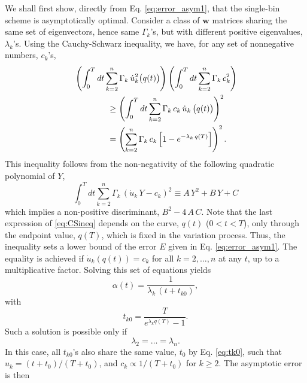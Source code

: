 \documentclass[reprint, floatfix]{revtex4-1}
\newcommand{\Err}{E}
\begin{document}
We shall first show,
directly from Eq. \eqref{eq:error_asym1},
that the single-bin scheme is asymptotically optimal.
%
Consider a class of $\mathbf w$ matrices
sharing the same set of eigenvectors,
hence same $\Gamma_k$'s,
but with different positive eigenvalues,
$\lambda_k$'s.
%
Using the Cauchy-Schwarz inequality, we have,
for any set of nonnegative numbers, $c_k$'s,
%
\begin{align}
&
\left(
  \int_0^T dt
    \sum_{k = 2}^n
      \Gamma_k \, \dot u_k^2\bigl( q(t) \bigr)
\right)
%
\left(
  \int_0^T dt
    \sum_{k = 2}^n
      \Gamma_k \, c_k^2
\right)
%
\notag
\\
&
\qquad \qquad
\ge
\left(
  \int_0^T dt
    \sum_{k = 2}^n
      \Gamma_k \, c_k \, \dot u_k \, \bigl( q(t) \bigr)
\right)^2
\notag
\\
&
\qquad \qquad
=
\left(
  \sum_{k = 2}^n \Gamma_k \, c_k
    \left[
      1 - e^{ -\lambda_k \, q(T) }
    \right]
\right)^2.
\label{eq:CSineq}
\end{align}
%
This inequality follows from the non-negativity of
the following quadratic polynomial of $Y$,
$$
\int_0^T
  dt \sum_{k = 2}^n \Gamma_k \,
    \left( \dot u_k \, Y - c_k \right)^2
  \equiv
  A \, Y^2 + B \, Y + C
$$
which implies a non-positive discriminant,
$B^2 - 4 \, A \, C$.
%
Note that the last expression of \eqref{eq:CSineq}
depends on the curve, $q(t)$ ($0 < t < T$),
only through the endpoint value, $q(T)$,
which is fixed in the variation process.
%
Thus, the inequality sets a lower bound
of the error $\Err$
given in Eq. \eqref{eq:error_asym1}.
%
The equality is achieved
if $\dot u_k\left( q(t) \right) = c_k$
for all $k = 2, \dots, n$ at any $t$,
up to a multiplicative factor.
%
Solving this set of equations yields
%
\begin{equation}
  \alpha(t) = \frac{              1             }
                   { \lambda_k \, (t + t_{k0} ) },
\label{eq:alpha_invtk}
\end{equation}
with
\begin{equation}
  t_{k0} = \frac{             T            }
                { e^{ \lambda_k q(T) } - 1 }.
\label{eq:tk0}
\end{equation}
%
Such a solution is possible only if
%
\begin{equation}
\lambda_2 = \dots = \lambda_n.
\end{equation}
%
In this case,
all $t_{k0}$'s also share the same value,
$t_0$ by Eq. \eqref{eq:tk0},
such that
$u_k = (t + t_0) / (T + t_0)$,
and
$c_k \propto 1/(T + t_0)$
for $k \ge 2$.
%
The asymptotic error is then
\end{document}
